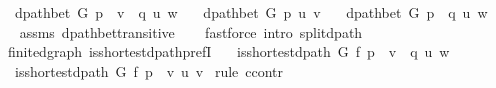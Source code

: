 \begin{isabellebody}
\ \ \ {\isachardoublequoteopen}dpath{\isacharunderscore}{\kern0pt}bet\ G\ {\isacharparenleft}{\kern0pt}p\ {\isacharat}{\kern0pt}\ {\isacharbrackleft}{\kern0pt}v{\isacharbrackright}{\kern0pt}\ {\isacharat}{\kern0pt}\ q{\isacharparenright}{\kern0pt}\ u\ w{\isachardoublequoteclose}\isanewline
\ \ \ {\isachardoublequoteopen}dpath{\isacharunderscore}{\kern0pt}bet\ G\ p{\isacharprime}{\kern0pt}\ u\ v{\isachardoublequoteclose}\isanewline
\ \ \ {\isachardoublequoteopen}dpath{\isacharunderscore}{\kern0pt}bet\ G\ {\isacharparenleft}{\kern0pt}p{\isacharprime}{\kern0pt}\ {\isacharat}{\kern0pt}\ q{\isacharparenright}{\kern0pt}\ u\ w{\isachardoublequoteclose}%
\endisataginvisible
{\isafoldinvisible}%
%
\isadeliminvisible
\isanewline
%
\endisadeliminvisible
%
\isadelimproof
\ \ %
\endisadelimproof
%
\isatagproof
{}\isamarkupfalse%
\ assms\ dpath{\isacharunderscore}{\kern0pt}bet{\isacharunderscore}{\kern0pt}transitive\isanewline
\ \ \isamarkupfalse%
\ {\isacharparenleft}{\kern0pt}fastforce\ intro{\isacharcolon}{\kern0pt}\ split{\isacharunderscore}{\kern0pt}dpath{\isacharparenright}{\kern0pt}%
\endisatagproof
{\isafoldproof}%
%
\isadelimproof
\isanewline
%
\endisadelimproof
%
\isadeliminvisible
\isanewline
%
\endisadeliminvisible
%
\isataginvisible
{}\isamarkupfalse%
\ {\isacharparenleft}{\kern0pt}\ finite{\isacharunderscore}{\kern0pt}dgraph{\isacharparenright}{\kern0pt}\ is{\isacharunderscore}{\kern0pt}shortest{\isacharunderscore}{\kern0pt}dpath{\isacharunderscore}{\kern0pt}prefI{\isacharcolon}{\kern0pt}\isanewline
\ \ \ {\isachardoublequoteopen}is{\isacharunderscore}{\kern0pt}shortest{\isacharunderscore}{\kern0pt}dpath\ G\ f\ {\isacharparenleft}{\kern0pt}p\ {\isacharat}{\kern0pt}\ {\isacharbrackleft}{\kern0pt}v{\isacharbrackright}{\kern0pt}\ {\isacharat}{\kern0pt}\ q{\isacharparenright}{\kern0pt}\ u\ w{\isachardoublequoteclose}\isanewline
\ \ \ {\isachardoublequoteopen}is{\isacharunderscore}{\kern0pt}shortest{\isacharunderscore}{\kern0pt}dpath\ G\ f\ {\isacharparenleft}{\kern0pt}p\ {\isacharat}{\kern0pt}\ {\isacharbrackleft}{\kern0pt}v{\isacharbrackright}{\kern0pt}{\isacharparenright}{\kern0pt}\ u\ v{\isachardoublequoteclose}%
\endisataginvisible
{\isafoldinvisible}%
%
\isadeliminvisible
\isanewline
%
\endisadeliminvisible
%
\isadelimproof
%
\endisadelimproof
%
\isatagproof
{}\isamarkupfalse%
\ {\isacharparenleft}{\kern0pt}rule\ ccontr{\isacharparenright}{\kern0pt}\isanewline
\ \ \isamarkupfalse%

\end{isabellebody}

